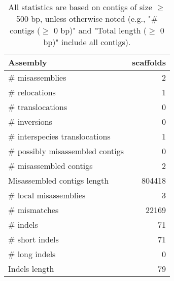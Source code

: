 \documentclass[12pt,a4paper]{article}
\begin{document}
\begin{table}[ht]
\begin{center}
\caption{All statistics are based on contigs of size $\geq$ 500 bp, unless otherwise noted (e.g., "\# contigs ($\geq$ 0 bp)" and "Total length ($\geq$ 0 bp)" include all contigs).}
\begin{tabular}{|l*{1}{|r}|}
\hline
Assembly & scaffolds \\ \hline
\# misassemblies & 2 \\ \hline
\hspace{5mm}\# relocations & 1 \\ \hline
\hspace{5mm}\# translocations & 0 \\ \hline
\hspace{5mm}\# inversions & 0 \\ \hline
\hspace{5mm}\# interspecies translocations & 1 \\ \hline
\# possibly misassembled contigs & 0 \\ \hline
\# misassembled contigs & 2 \\ \hline
Misassembled contigs length & 804418 \\ \hline
\# local misassemblies & 3 \\ \hline
\# mismatches & 22169 \\ \hline
\# indels & 71 \\ \hline
\hspace{5mm}\# short indels & 71 \\ \hline
\hspace{5mm}\# long indels & 0 \\ \hline
Indels length & 79 \\ \hline
\end{tabular}
\end{center}
\end{table}
\end{document}
